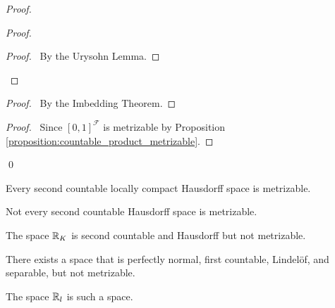 \begin{proof}
    \pf
    \begin{proof}
        \begin{proof}
            \pf\ By the Urysohn Lemma.
        \end{proof}
    \end{proof}
    \begin{proof}
        \pf\ By the Imbedding Theorem.
    \end{proof}
    \qedstep
    \begin{proof}
        \pf\ Since $[0,1]^{\mathcal{F}}$ is metrizable by Proposition
        \ref{proposition:countable_product_metrizable}.
    \end{proof}
    \qed
\end{proof}

\begin{corollary}
    Every second countable locally compact Hausdorff space is metrizable.
\end{corollary}

\begin{example}
    Not every second countable Hausdorff space is metrizable.

    The space $\mathbb{R}_K$ is second countable and Hausdorff but not metrizable.
\end{example}

\begin{example}
    There exists a space that is perfectly normal, first countable, Lindel\"{o}f,
    and separable, but not metrizable.

    The space $\mathbb{R}_l$ is such a space.
\end{example}

